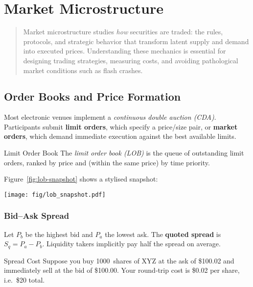 \chapter{Market Microstructure}\label{ch:microstructure}

\begin{abstract}
Market microstructure studies \emph{how} securities are traded:
the rules, protocols, and strategic behavior that transform latent supply
and demand into executed prices.  
Understanding these mechanics is essential for designing trading strategies,
measuring costs, and avoiding pathological market conditions such as flash crashes.
\end{abstract}

\section{Order Books and Price Formation}

Most electronic venues implement a \emph{continuous double auction (CDA)}.
Participants submit \textbf{limit orders}, which specify a price/size pair,
or \textbf{market orders}, which demand immediate execution
against the best available limits.

\begin{definition}{Limit Order Book}{}
The \emph{limit order book (LOB)} is the queue of outstanding limit orders,
ranked by price and (within the same price) by time priority.
\end{definition}

Figure~\ref{fig:lob-snapshot} shows a stylised snapshot:
\begin{center}
\texttt{[image: fig/lob\_snapshot.pdf]}
\end{center}

\subsection{Bid–Ask Spread}

Let \(P_b\) be the highest bid and \(P_a\) the lowest ask.
The \textbf{quoted spread} is \(S_q = P_a - P_b\).
Liquidity takers implicitly pay half the spread on average.

\begin{example}{Spread Cost}{}
Suppose you buy \SI{1000}{shares} of XYZ at the ask of \$100.02
and immediately sell at the bid of \$100.00.
Your round‑trip cost is \$0.02 per share, i.e.\ \$20 total. \qedhere
\end{example}

